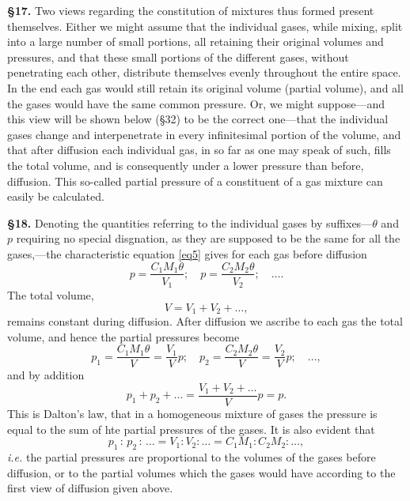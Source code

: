 \documentclass[oneside,12pt]{book}
\begin{document}
\textbf{\S 17.} Two views regarding the constitution of mixtures thus formed present themselves. Either we might assume that the individual gases, while mixing, split into a large number of small portions, all retaining their original volumes and pressures, and that these small portions of the different gases, without penetrating each other, distribute themselves evenly throughout the entire space. In the end each gas would still retain its original volume (partial volume), and all the gases would have the same common pressure. Or, we might suppose---and this view will be shown below (\S 32) to be the correct one---that the individual gases change and interpenetrate in every infinitesimal portion of the volume, and that after diffusion each individual gas, in so far as one may speak of such, fills the total volume, and is consequently under a lower pressure than before, diffusion. This so-called partial pressure of a constituent of a gas mixture can easily be calculated. \par

\textbf{\S 18.} Denoting the quantities referring to the individual gases by suffixes---$\theta$ and $p$ requiring no special disgnation, as they are supposed to be the same for all the gases,---the characteristic equation \eqref{eq5} gives for each gas before diffusion
$$p=\frac{C_1M_1\theta}{V_1};\quad p=\frac{C_2M_2\theta}{V_2};\quad \dots .$$
The total volume,
$$V=V_1+V_2+\dots ,$$
remains constant during diffusion. After diffusion we ascribe to each gas the total volume, and hence the partial pressures become
\begin{equation}
    p_1=\frac{C_1M_1\theta}{V}=\frac{V_1}{V}p;\quad p_2=\frac{C_2M_2\theta}{V}=\frac{V_2}{V}p;\quad \dots ,
    \label{eq7}
\end{equation}
and by addition
\begin{equation}
    p_1+p_2+\dots=\frac{V_1+V_2+\dots}{V}p=p.
    \label{eq8}
\end{equation}
This is Dalton's law, that in a homogeneous mixture of gases the pressure is equal to the sum of hte partial pressures of the gases. It is also evident that
\begin{equation}
    p_1\, :\, p_2\,:\, \dots=V_1 : V_2 :\dots=C_1M_1:C_2M_2:\dots,
    \label{eq9}
\end{equation}
\textit{i.e.} the partial pressures are proportional to the volumes of the gases before diffusion, or to the partial volumes which the gases would have according to the first view of diffusion given above. \par
\end{document}

